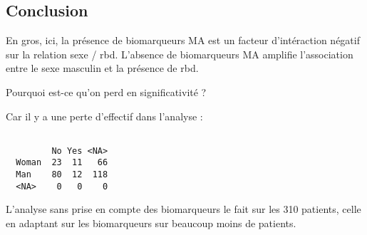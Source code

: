 \documentclass[
  letterpaper,
  DIV=11,
  numbers=noendperiod]{scrartcl}
\newenvironment{Shaded}{\begin{snugshade}}{\end{snugshade}}
\newcommand{\AttributeTok}[1]{\textcolor[rgb]{0.40,0.45,0.13}{#1}}
\newcommand{\FunctionTok}[1]{\textcolor[rgb]{0.28,0.35,0.67}{#1}}
\newcommand{\NormalTok}[1]{\textcolor[rgb]{0.00,0.23,0.31}{#1}}
\newcommand{\SpecialCharTok}[1]{\textcolor[rgb]{0.37,0.37,0.37}{#1}}
\newcommand{\StringTok}[1]{\textcolor[rgb]{0.13,0.47,0.30}{#1}}
\begin{document}
\hypertarget{conclusion}{%
\subsection{Conclusion}\label{conclusion}}

En gros, ici, la présence de biomarqueurs MA est un facteur
d'intéraction négatif sur la relation sexe / rbd. L'absence de
biomarqueurs MA amplifie l'association entre le sexe masculin et la
présence de rbd.

Pourquoi est-ce qu'on perd en significativité ?

Car il y a une perte d'effectif dans l'analyse :

\begin{Shaded}
\end{Shaded}

\begin{verbatim}
       
         No Yes <NA>
  Woman  23  11   66
  Man    80  12  118
  <NA>    0   0    0
\end{verbatim}

L'analyse sans prise en compte des biomarqueurs le fait sur les 310
patients, celle en adaptant sur les biomarqueurs sur beaucoup moins de
patients.
\end{document}
